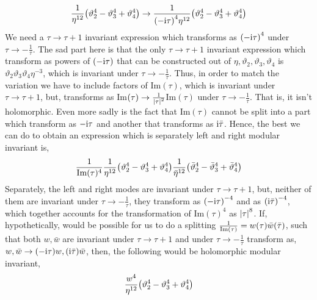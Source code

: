 \[\frac{1}{\eta^{12}}\qty(\vartheta^4_2-\vartheta^4_3+\vartheta^4_4)\rightarrow\frac{1}{\qty(-\textnormal{i}\tau)^4\eta^{12}}\qty(\vartheta^4_2-\vartheta^4_3+\vartheta^4_4)\]
We need a $\tau\rightarrow\tau+1$ invariant expression which transforms as $\qty(-\textnormal{i}\tau)^4$ under $\tau\rightarrow-\frac1\tau$. The 
sad part here is that the only $\tau\rightarrow\tau+1$ invariant expression which transform as powers of $\qty(-\textnormal{i}\tau)$ that 
can be constructed out of $\eta,\vartheta_2,\vartheta_3,\vartheta_4$ is $\vartheta_2\vartheta_3\vartheta_4\eta^{-3}$, which 
is invariant under $\tau\rightarrow-\frac1\tau$. Thus, in order to match the variation we have to include 
factors of Im$(\tau)$, which is invariant under $\tau\rightarrow\tau+1$, but, transforms as 
Im$(\tau)\rightarrow\frac{1}{\abs{\tau}^2}$Im$(\tau)$ under $\tau\rightarrow-\frac1\tau$. That is, it isn't holomorphic. 
Even more sadly is the fact that Im$(\tau)$ cannot be split into a part which transform as $-\textnormal{i}\tau$ and 
another that transforms as $\textnormal{i}\bar\tau$. Hence, the best we can do to 
obtain an expression which is separately left and right modular invariant is,
\[\frac{1}{\textnormal{Im}(\tau)^4}\frac{1}{\eta^{12}}\qty(\vartheta^4_2-\vartheta^4_3+\vartheta^4_4)\frac{1}{{\bar\eta}^{12}}\qty({\bar\vartheta}^4_2-{\bar\vartheta}^4_3+{\bar\vartheta}^4_4)\]
Separately, the left and right modes are invariant under $\tau\rightarrow\tau+1$, but, neither of them are invariant 
under $\tau\rightarrow-\frac1\tau$, they transform as $\qty(-\textnormal{i}\tau)^{-4}$ and as $\qty(\textnormal{i}\bar\tau)^{-4}$, which 
together accounts for the transformation of Im$(\tau)^4$ as $\abs{\tau}^8$. If, hypothetically, would be possible for 
us to do a splitting $\frac{1}{\textnormal{Im}(\tau)}=w(\tau)\bar w(\bar \tau)$, such that both $w,\bar w$ are 
invariant under $\tau\rightarrow\tau+1$ and under $\tau\rightarrow-\frac1\tau$ transform as, $w,\bar w\rightarrow \qty(-\textnormal{i}\tau) w,\qty(\textnormal{i}\bar\tau)\bar w$, 
then, the following would be holomorphic modular invariant, \[\frac{w^4}{\eta^{12}}\qty(\vartheta^4_2-\vartheta^4_3+\vartheta^4_4)\]



